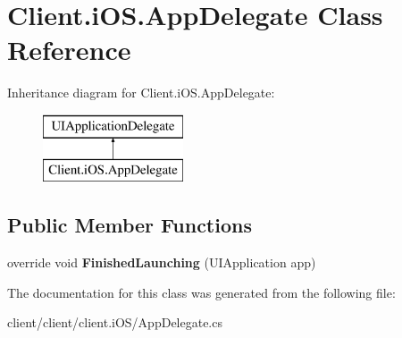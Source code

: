 \hypertarget{classClient_1_1iOS_1_1AppDelegate}{\section{Client.\-i\-O\-S.\-App\-Delegate Class Reference}
\label{classClient_1_1iOS_1_1AppDelegate}
}
Inheritance diagram for Client.\-i\-O\-S.\-App\-Delegate\-:\begin{figure}[H]
\begin{center}
\leavevmode
\includegraphics[height=2.000000cm]{classClient_1_1iOS_1_1AppDelegate}
\end{center}
\end{figure}
\subsection*{Public Member Functions}
\begin{DoxyCompactItemize}
\item 
\hypertarget{classClient_1_1iOS_1_1AppDelegate_aa0ee3c7acee2f19211c95e6eb7fe00af}{override void {\bfseries Finished\-Launching} (U\-I\-Application app)}\label{classClient_1_1iOS_1_1AppDelegate_aa0ee3c7acee2f19211c95e6eb7fe00af}

\end{DoxyCompactItemize}


The documentation for this class was generated from the following file\-:\begin{DoxyCompactItemize}
\item 
client/client/client.\-i\-O\-S/App\-Delegate.\-cs\end{DoxyCompactItemize}
